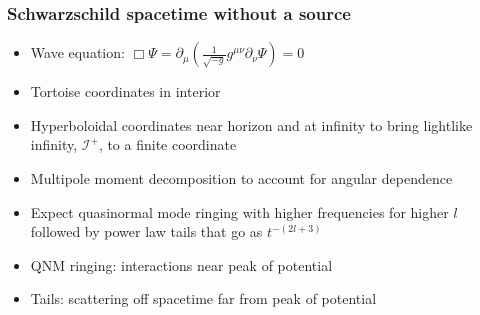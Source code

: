 \documentclass{beamer}
\begin{document}
\begin{frame}
  \frametitle{Schwarzschild spacetime without a source}
  \begin{itemize}
  \item Wave equation: $\Box\Psi=\partial_\mu\left(\frac{1}{\sqrt{-g}}g^{\mu\nu}\partial_\nu\Psi\right)=0$
  \item Tortoise coordinates in interior
  \item Hyperboloidal coordinates near horizon and at infinity to bring lightlike infinity, $\mathcal{I}^+$, to a finite coordinate
  \item Multipole moment decomposition to account for angular dependence
  \item Expect quasinormal mode ringing with higher frequencies for higher $l$ followed by power law tails that go as $t^{-(2l+3)}$
  \item QNM ringing: interactions near peak of potential
  \item Tails: scattering off spacetime far from peak of potential
  \end{itemize}
\end{frame}
\end{document}
